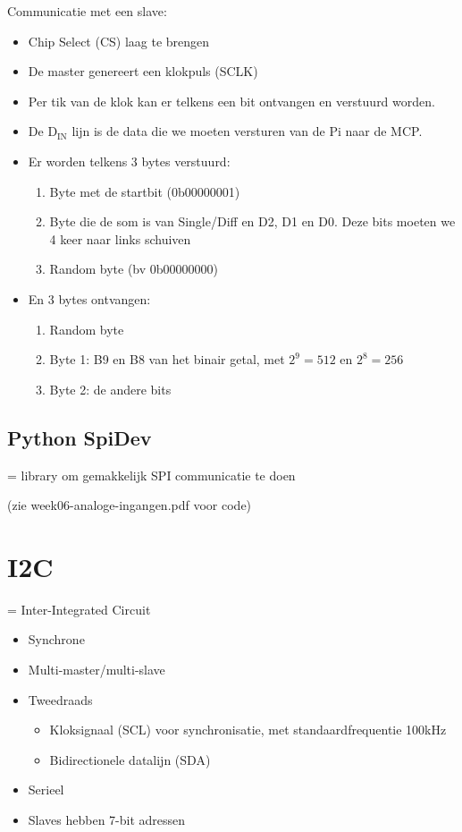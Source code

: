 \documentclass{article}
\begin{document}
Communicatie met een slave:

\begin{itemize}
    \item Chip Select (CS) laag te brengen
    \item De master genereert een klokpuls (SCLK)
    \item Per tik van de klok kan er telkens een bit ontvangen en verstuurd worden.
    \item De $\text{D}_{\text{IN}}$ lijn is de data die we moeten versturen van de Pi naar de MCP.
    \item Er worden telkens 3 bytes verstuurd:
    \begin{enumerate}
        \item Byte met de startbit (0b00000001)
        \item Byte die de som is van Single/Diff en D2, D1 en D0. Deze bits moeten we 4 keer naar links schuiven
        \item Random byte (bv 0b00000000)
    \end{enumerate}
    \item En 3 bytes ontvangen:
    \begin{enumerate}
        \item Random byte 
        \item Byte 1: B9 en B8 van het binair getal, met $2^9=512$  en $2^8=256$
        \item Byte 2: de andere bits
    \end{enumerate}
\end{itemize}

\subsection{Python SpiDev}
= library om gemakkelijk SPI communicatie te doen

(zie week06-analoge-ingangen.pdf voor code)

\section{I2C}
= Inter-Integrated Circuit

\begin{itemize}
    \item Synchrone
    \item Multi-master/multi-slave 
    \item Tweedraads
    \begin{itemize}
        \item Kloksignaal (SCL) voor synchronisatie, met standaardfrequentie 100kHz
        \item Bidirectionele datalijn (SDA)
    \end{itemize}
    \item Serieel
    \item Slaves hebben 7-bit adressen
\end{itemize}
\end{document}
